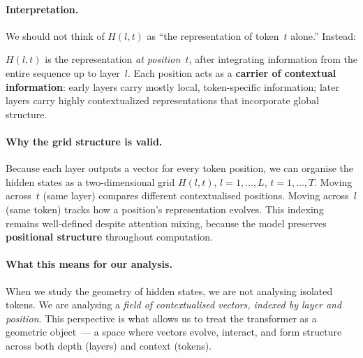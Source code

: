 \documentclass[11pt, twoside, openright]{memoir}
\numberwithin{equation}{chapter}
\begin{document}
\paragraph{Interpretation.}
We should not think of $H(l,t)$ as ``the representation of token~$t$
alone.''  Instead:

\begin{analogy}
$H(l,t)$ is the representation \emph{at position~$t$}, after
integrating information from the entire sequence up to layer~$l$.
Each position acts as a \textbf{carrier of contextual information}:
early layers carry mostly local, token-specific information; later
layers carry highly contextualized representations that incorporate
global structure.
\end{analogy}

\paragraph{Why the grid structure is valid.}
Because each layer outputs a vector for every token position, we can
organise the hidden states as a two-dimensional grid
$H(l,t)$, $l = 1,\dots,L$, $t = 1,\dots,T$.
Moving across~$t$ (same layer) compares different contextualised
positions.  Moving across~$l$ (same token) tracks how a position's
representation evolves.  This indexing remains well-defined despite
attention mixing, because the model preserves \textbf{positional
structure} throughout computation.

\paragraph{What this means for our analysis.}
When we study the geometry of hidden states, we are not analysing
isolated tokens.  We are analysing a \emph{field of contextualised
vectors, indexed by layer and position}.  This perspective is what
allows us to treat the transformer as a geometric object~--- a space
where vectors evolve, interact, and form structure across both depth
(layers) and context (tokens).
\end{document}
